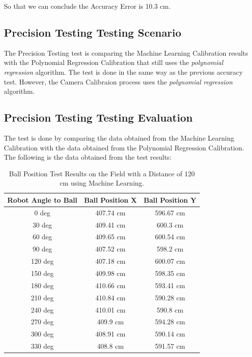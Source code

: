So that we can conclude the Accuracy Error is 10.3 cm. 


\subsection{Precision Testing Testing Scenario}
\label{sec:skenariopengujian2}

The Precision Testing test is comparing the Machine Learning Calibration results with the Polynomial Regression Calibration that still uses the \emph{polynomial regression} algorithm. The test is done in the same way as the previous accuracy test. However, the Camera Calibraion process uses the \emph{polynomial regression} algorithm.

\subsection{Precision Testing Testing Evaluation}
\label{sec:32}

The test is done by comparing the data obtained from the Machine Learning Calibration with the data obtained from the Polynomial Regression Calibration. The following is the data obtained from the test results: 

\begin{table}[H]
  \caption{Ball Position Test Results on the Field with a Distance of 120 cm using Machine Learning.}
  \begin{center}
    \begin{tabular}{|c|c|c|}
      \hline
    \rowcolor[HTML]{C0C0C0}
  \textbf{Robot Angle to Ball} & \textbf{Ball Position X} & \textbf{Ball Position Y} \\
  \hline

  0 deg            & 407.74 cm                & 596.67 cm            \\
  30 deg           & 409.41 cm                & 600.3 cm            \\
  60 deg           & 409.65 cm                & 600.54 cm            \\
  90 deg           & 407.52 cm                & 598.2 cm           \\
  120 deg           & 407.18 cm                & 600.07 cm           \\
  150 deg           & 409.98 cm                & 598.35 cm           \\
  180 deg           & 410.66 cm                & 593.41 cm           \\
  210 deg           & 410.84 cm                & 590.28 cm           \\
  240 deg           & 410.01 cm                & 590.8 cm           \\
  270 deg           & 409.9 cm                & 594.28 cm           \\
  300 deg           & 408.91 cm                & 590.14 cm           \\
  330 deg           & 408.8 cm                & 591.57 cm           \\
  \hline
\end{tabular}
\end{center}
\end{table}

